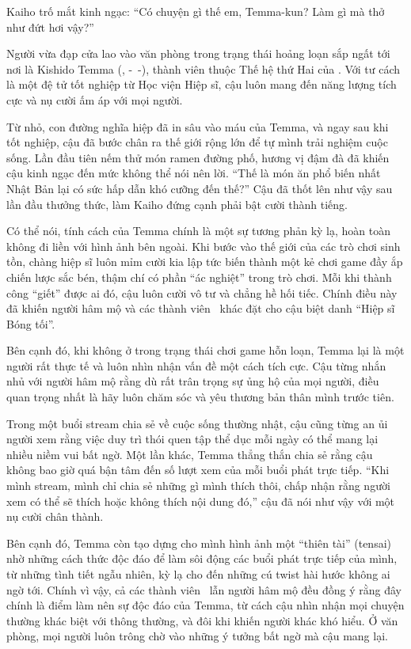 \documentclass[../main.tex]{subfiles}
\begin{document}
Kaiho trố mắt kinh ngạc: ``Có chuyện gì thế em, Temma-kun? Làm gì mà thở như đứt hơi vậy?''

\chrint

Người vừa đạp cửa lao vào văn phòng trong trạng thái hoảng loạn sắp ngất tới nơi là Kishido Temma (, -\ -), thành viên thuộc Thế hệ thứ Hai của \hls. Với tư cách là một đệ tử tốt nghiệp từ Học viện Hiệp sĩ, cậu luôn mang đến năng lượng tích cực và nụ cười ấm áp với mọi người.


Từ nhỏ, con đường nghĩa hiệp đã in sâu vào máu của Temma, và ngay sau khi tốt nghiệp, cậu đã bước chân ra thế giới rộng lớn để tự mình trải nghiệm cuộc sống. Lần đầu tiên nếm thử món ramen đường phố, hương vị đậm đà đã khiến cậu kinh ngạc đến mức không thể nói nên lời. ``Thế là món ăn phổ biến nhất Nhật Bản lại có sức hấp dẫn khó cưỡng đến thế?'' Cậu đã thốt lên như vậy sau lần đầu thưởng thức, làm Kaiho đứng cạnh phải bật cười thành tiếng.

Có thể nói, tính cách của Temma chính là một sự tương phản kỳ lạ, hoàn toàn không đi liền với hình ảnh bên ngoài. Khi bước vào thế giới của các trò chơi sinh tồn, chàng hiệp sĩ luôn mỉm cười kia lập tức biến thành một kẻ chơi game đầy ắp chiến lược sắc bén, thậm chí có phần ``ác nghiệt'' trong trò chơi. Mỗi khi thành công ``giết'' được ai đó, cậu luôn cười vô tư và chẳng hề hối tiếc. Chính điều này đã khiến người hâm mộ và các thành viên \hls\ khác đặt cho cậu biệt danh ``Hiệp sĩ Bóng tối''.

Bên cạnh đó, khi không ở trong trạng thái chơi game hỗn loạn, Temma lại là một người rất thực tế và luôn nhìn nhận vấn đề một cách tích cực. Cậu từng nhắn nhủ với người hâm mộ rằng dù rất trân trọng sự ủng hộ của mọi người, điều quan trọng nhất là hãy luôn chăm sóc và yêu thương bản thân mình trước tiên.

Trong một buổi stream chia sẻ về cuộc sống thường nhật, cậu cũng từng an ủi người xem rằng việc duy trì thói quen tập thể dục mỗi ngày có thể mang lại nhiều niềm vui bất ngờ. Một lần khác, Temma thẳng thắn chia sẻ rằng cậu không bao giờ quá bận tâm đến số lượt xem của mỗi buổi phát trực tiếp. ``Khi mình stream, mình chỉ chia sẻ những gì mình thích thôi, chấp nhận rằng người xem có thể sẽ thích hoặc không thích nội dung đó,'' cậu đã nói như vậy với một nụ cười chân thành.

Bên cạnh đó, Temma còn tạo dựng cho mình hình ảnh một ``thiên tài'' (tensai) nhờ những cách thức độc đáo để làm sôi động các buổi phát trực tiếp của mình, từ những tình tiết ngẫu nhiên, kỳ lạ cho đến những cú twist hài hước không ai ngờ tới. Chính vì vậy, cả các thành viên \hls\ lẫn người hâm mộ đều đồng ý rằng đây chính là điểm làm nên sự độc đáo của Temma, từ cách cậu nhìn nhận mọi chuyện thường khác biệt với thông thường, và đôi khi khiến người khác khó hiểu. Ở văn phòng, mọi người luôn trông chờ vào những ý tưởng bất ngờ mà cậu mang lại.
\end{document}
